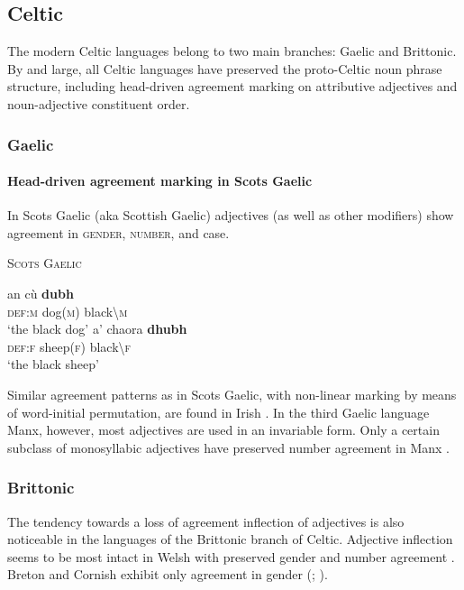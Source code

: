 \subsection{Celtic}
The modern Celtic languages belong to two main branches: Gaelic and Brittonic. By and large, all Celtic languages have preserved the proto-Celtic noun phrase structure, including head-driven agreement marking on attributive adjectives and noun-adjective constituent order.

\subsubsection{Gaelic}
\paragraph{Head-driven agreement marking in Scots Gaelic} 
In Scots Gaelic (aka Scottish Gaelic) adjectives (as well as other modifiers) show agreement in \textsc{gender, number}, and {\sc case}.
\newpage
\begin{exe}
\ex \textsc{Scots Gaelic} \cite[201]{macauley1992}
\begin{xlist}
\ex
\gll	an cù \textbf{dubh}\\
	\textsc{def:m} dog(\textsc{m}) black\textbackslash\textsc{m}\\
\glt	‘the black dog’
\ex
\gll	a' chaora \textbf{dhubh}\\
	\textsc{def:f} sheep(\textsc{f}) black\textbackslash\textsc{f}\\
\glt	‘the black sheep’
\end{xlist}
\end{exe}
Similar agreement patterns as in Scots Gaelic, with non-linear marking by means of word-initial permutation, are found in Irish \cite[73, 97]{odochartaigh1992}. In the third Gaelic language Manx, however, most adjectives are used in an invariable form. Only a certain subclass of monosyllabic adjectives have preserved number agreement in Manx \cite[127]{thomsen1992}.

\subsubsection{Brittonic}
The tendency towards a loss of agreement inflection of adjectives is also noticeable in the languages of the Brittonic branch of Celtic. Adjective inflection seems to be most intact in Welsh with preserved gender and number agreement \cite[298–299]{thomas1992a}. Breton and Cornish exhibit only agreement in gender (\citealt[405]{ternes1992}; \citealt[355]{thomas1992b}).

